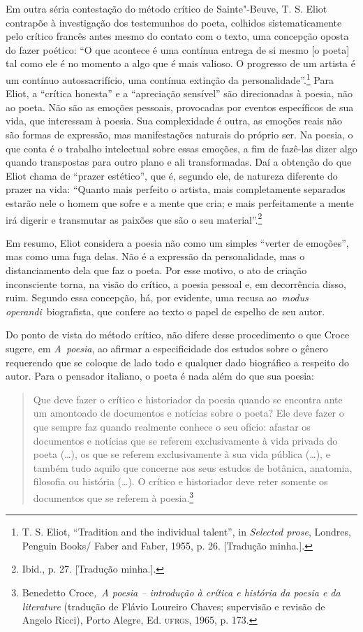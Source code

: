 Em outra séria contestação do método crítico de Sainte"-Beuve, T. S.
Eliot contrapõe à investigação dos testemunhos do poeta, colhidos
sistematicamente pelo crítico francês antes mesmo do contato com o
texto, uma concepção oposta do fazer poético:
``O que acontece é uma contínua entrega de
si mesmo {[}o poeta{]} tal como ele é no momento a algo que é mais
valioso. O progresso de um artista é um contínuo autossacrifício, uma
contínua extinção da personalidade''.\footnote{T. S. Eliot, ``Tradition
  and the individual talent'', in \emph{Selected prose}, Londres,
  Penguin Books/ Faber and Faber, 1955, p. 26. {[}Tradução minha.{]}.}
Para Eliot, a ``crítica honesta'' e a ``apreciação sensível'' são
direcionadas à poesia, não ao poeta. Não são as emoções pessoais,
provocadas por eventos específicos de sua vida, que interessam à poesia.
Sua complexidade é outra, as emoções reais não são formas de expressão,
mas manifestações naturais do próprio ser. Na poesia, o que conta é o
trabalho intelectual sobre essas emoções, a fim de fazê-las dizer algo
quando transpostas para outro plano e ali transformadas. Daí a obtenção
do que Eliot chama de ``prazer estético'', que é, segundo ele, de
natureza diferente do prazer na vida: ``Quanto mais perfeito o artista,
mais completamente separados estarão nele o homem que sofre e a mente
que cria; e mais perfeitamente a mente irá digerir e transmutar as
paixões que são o seu material''.\footnote{Ibid., p. 27. {[}Tradução
  minha.{]}.}

Em resumo, Eliot considera a poesia não como um simples ``verter de
emoções'', mas como uma fuga delas. Não é a expressão da personalidade,
mas o distanciamento dela que faz o poeta. Por esse motivo, o ato de
criação inconsciente torna, na visão do crítico, a poesia pessoal e, em
decorrência disso, ruim. Segundo essa concepção, há, por evidente, uma
recusa ao~\emph{modus operandi~}biografista, que confere ao texto o
papel de espelho de seu autor.

Do ponto de vista do método crítico, não difere desse procedimento o que
Croce sugere, em \emph{A~poesia}, ao afirmar a especificidade dos
estudos sobre o gênero requerendo que se coloque de lado todo e qualquer
dado biográfico a respeito do autor. Para o pensador italiano, o poeta é
nada além do que sua poesia:

\begin{quote}
Que deve fazer o crítico e historiador da poesia quando se encontra ante
um amontoado de documentos e notícias sobre o poeta? Ele deve fazer o
que sempre faz quando realmente conhece o seu ofício: afastar os
documentos e notícias que se referem exclusivamente à vida privada do
poeta (\ldots{}), os que se referem exclusivamente à sua vida pública (\ldots{}),
e também tudo aquilo que concerne aos seus estudos de botânica,
anatomia, filosofia ou história (\ldots{}). O crítico e historiador deve
reter somente os documentos que se referem à poesia.\footnote{Benedetto
  Croce\emph{,~A poesia -- introdução à crítica e história da poesia e
  da literature} (tradução de Flávio Loureiro Chaves; supervisão e
  revisão de Angelo Ricci), Porto Alegre, Ed. \textsc{ufrgs}, 1965, p.
  173.}
\end{quote}

